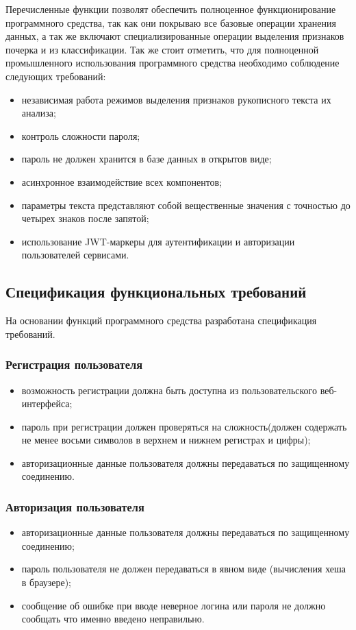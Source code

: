 Перечисленные функции позволят обеспечить полноценное функционирование программного средства, так как они покрываю все базовые операции хранения данных, а так же включают специализированные операции выделения признаков почерка и из классификации. Так же стоит отметить, что для полноценной промышленного использования программного средства необходимо соблюдение следующих требований:
\begin{itemize}
  \item независимая работа режимов выделения признаков рукописного текста их анализа;
  \item контроль сложности пароля;
  \item пароль не должен хранится в базе данных в открытов виде;
  \item асинхронное взаимодействие всех компонентов;
  \item параметры текста представляют собой вещественные значения с точностью до четырех знаков после запятой;
  \item использование JWT-маркеры для аутентификации и авторизации пользователей сервисами.
\end{itemize}

\subsection{Спецификация функциональных требований}
На основании функций программного средства разработана спецификация требований. 
\subsubsection{Регистрация пользователя}
\label{sec:freq:reg}
\begin{itemize}
	\item возможность регистрации должна быть доступна из пользовательского веб-интерфейса;
	\item пароль при регистрации должен проверяться на сложность(должен содержать не менее восьми символов в верхнем и нижнем регистрах и \mbox{цифры);}
	\item авторизационные данные пользователя должны передаваться по защищенному соединению.
\end{itemize}

\subsubsection{Авторизация пользователя}
\label{sec:freq:auth}
\begin{itemize}
	\item авторизационные данные пользователя должны передаваться по защищенному соединению;
	\item пароль пользователя не должен передаваться в явном виде (вычисления хеша в браузере);
 	\item сообщение об ошибке при вводе неверное логина или пароля не должно сообщать что именно введено неправильно.
\end{itemize}

